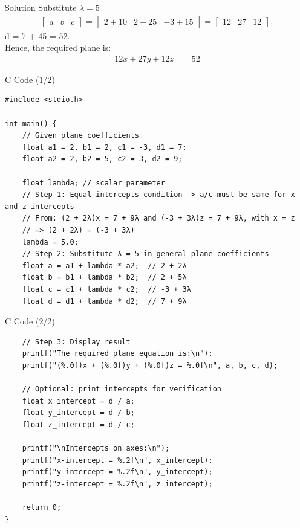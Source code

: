 \documentclass{beamer}
\begin{document}
\begin{frame}{Solution}
Substitute \(\lambda = 5\)
\begin{align}
\begin{bmatrix} a & b & c \end{bmatrix} = \begin{bmatrix} 2 + 10 & 2 + 25 & -3 + 15 \end{bmatrix} = \begin{bmatrix} 12 & 27 & 12 \end{bmatrix}, 
\end{align}
\quad    d = 7 + 45 = 52.
\\Hence, the required plane is:
\begin{align}
12x + 27y + 12z &= 52 
\end{align}
\end{frame}

\begin{frame}[fragile]{C Code (1/2)}
\lstset{language=C}
\begin{lstlisting}
#include <stdio.h>

int main() {
    // Given plane coefficients
    float a1 = 2, b1 = 2, c1 = -3, d1 = 7;
    float a2 = 2, b2 = 5, c2 = 3, d2 = 9;
    
    float lambda; // scalar parameter
    // Step 1: Equal intercepts condition -> a/c must be same for x and z intercepts
    // From: (2 + 2λ)x = 7 + 9λ and (-3 + 3λ)z = 7 + 9λ, with x = z
    // => (2 + 2λ) = (-3 + 3λ)
    lambda = 5.0;
    // Step 2: Substitute λ = 5 in general plane coefficients
    float a = a1 + lambda * a2;  // 2 + 2λ
    float b = b1 + lambda * b2;  // 2 + 5λ
    float c = c1 + lambda * c2;  // -3 + 3λ
    float d = d1 + lambda * d2;  // 7 + 9λ
\end{lstlisting}
\end{frame}

\begin{frame}[fragile]{C Code (2/2)}
\lstset{language=C}
\begin{lstlisting}
    // Step 3: Display result
    printf("The required plane equation is:\n");
    printf("(%.0f)x + (%.0f)y + (%.0f)z = %.0f\n", a, b, c, d);

    // Optional: print intercepts for verification
    float x_intercept = d / a;
    float y_intercept = d / b;
    float z_intercept = d / c;
    
    printf("\nIntercepts on axes:\n");
    printf("x-intercept = %.2f\n", x_intercept);
    printf("y-intercept = %.2f\n", y_intercept);
    printf("z-intercept = %.2f\n", z_intercept);

    return 0;
}

\end{lstlisting}
\end{frame}
\end{document}
